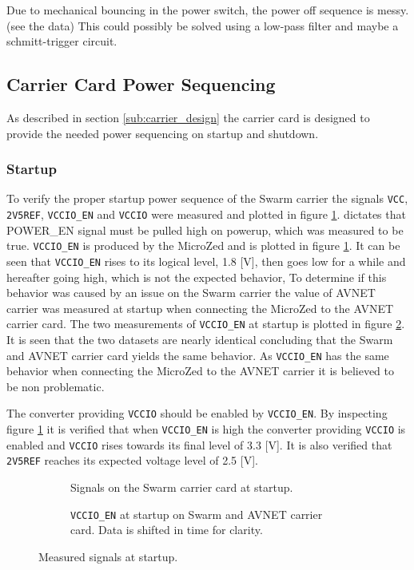 Due to mechanical bouncing in the power switch, the power off sequence is messy. (see the data)
This could possibly be solved using a low-pass filter and maybe a schmitt-trigger circuit.


\subsection{Carrier Card Power Sequencing}
As described in section \ref{sub:carrier_design} the carrier card is designed to provide the needed power sequencing on startup and shutdown.

\subsubsection*{Startup}
To verify the proper startup power sequence of the Swarm carrier the signals \texttt{VCC}, \texttt{2V5REF}, \texttt{VCCIO\_EN} and \texttt{VCCIO} were measured and plotted in figure \ref{fig:startup_swarm}.
\cite{design_carrier} dictates that POWER\_EN signal must be pulled high on powerup, which was measured to be true.
\texttt{VCCIO\_EN} is produced by the MicroZed and is plotted in figure \ref{fig:startup_swarm}. 
It can be seen that \texttt{VCCIO\_EN} rises to its logical level, 1.8 [V], then goes low for a while and hereafter going high, which is not the expected behavior,
To determine if this behavior was caused by an issue on the Swarm carrier the value of AVNET carrier  was measured at startup when connecting the MicroZed to the AVNET carrier card.
The two measurements of \texttt{VCCIO\_EN} at startup is plotted in figure \ref{fig:startup_vccioen}.
It is seen that the two datasets are nearly identical concluding that the Swarm and AVNET carrier card yields the same behavior.
As \texttt{VCCIO\_EN} has the same behavior when connecting the MicroZed to the AVNET carrier it is believed to be non problematic.

The converter providing \texttt{VCCIO} should be enabled by \texttt{VCCIO\_EN}.
By inspecting figure \ref{fig:startup_swarm} it is verified that when \texttt{VCCIO\_EN} is high the converter providing \texttt{VCCIO} is enabled and  \texttt{VCCIO} rises towards its final level of 3.3 [V].
It is also verified that \texttt{2V5REF} reaches its expected voltage level of 2.5 [V].

\begin{figure}
\centering
\begin{subfigure}[t]{.45\textwidth}
  \centering
    
  \caption{Signals on the Swarm carrier card at startup.}
  \label{fig:startup_swarm}
\end{subfigure}%
\hfill
\begin{subfigure}[t]{.45\textwidth}
  \centering
  
  \caption{\texttt{VCCIO\_EN} at startup on Swarm and AVNET carrier card. Data is shifted in time for clarity.}
  \label{fig:startup_vccioen}
\end{subfigure}
\caption{Measured signals at startup.}
\label{fig:startup_plot}
\end{figure}

